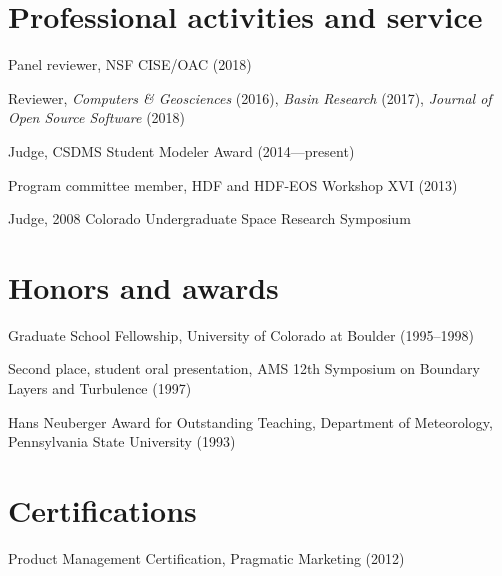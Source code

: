 \documentclass[letterpaper]{resume}
\begin{document}

\section{Professional activities and service}

\vspace{1.0em}
\begin{compactitem}[\itembullet]
  \item Panel reviewer, NSF CISE/OAC (2018)
  \item Reviewer, \textit{Computers \& Geosciences} (2016),
    \textit{Basin Research} (2017), \textit{Journal of Open Source
      Software} (2018)
  \item Judge, CSDMS Student Modeler Award (2014---present)
  \item Program committee member, HDF and HDF-EOS Workshop XVI (2013)
  \item Judge, 2008 Colorado Undergraduate Space Research Symposium
\end{compactitem}


\section{Honors and awards}

\vspace{1.0em}
\begin{compactitem}[\itembullet]
  \item Graduate School Fellowship, University of Colorado
    at Boulder (1995--1998)
  \item Second place, student oral presentation, AMS 12th
    Symposium on Boundary Layers and Turbulence (1997)
  \item Hans Neuberger Award for Outstanding Teaching,
    Department of Meteorology, Pennsylvania State University (1993)
\end{compactitem}


\section{Certifications}

\vspace{1.0em}
\begin{compactitem}[\itembullet]
  \item Product Management Certification, Pragmatic Marketing (2012)
\end{compactitem}

\end{document}
